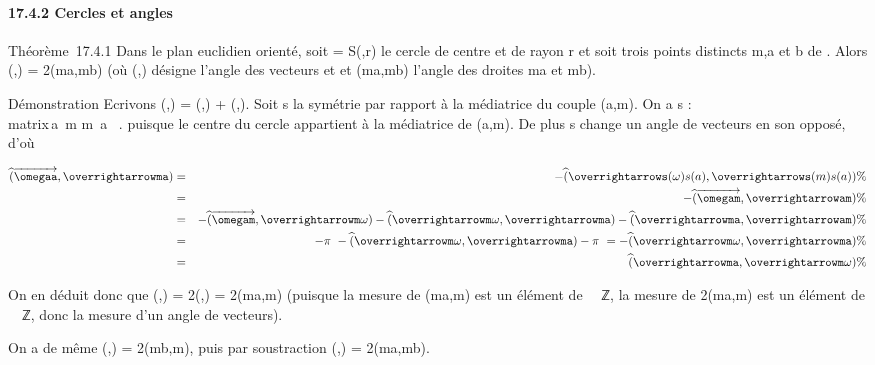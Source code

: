 \documentclass[]{article}
\begin{document}
\paragraph{17.4.2 Cercles et angles}

Théorème~17.4.1 Dans le plan euclidien orienté, soit \Gamma = S(\omega,r) le
cercle de centre \omega et de rayon r et soit trois points distincts m,a et b
de \Gamma. Alors
\widehat(\overrightarrow\omegaa,\overrightarrow\omegab)
= 2\widehat(ma,mb) (où
\widehat(\overrightarrow\omegaa,\overrightarrow\omegab)
désigne l'angle des vecteurs \overrightarrow\omegaa et
\overrightarrow\omegab et
\widehat(ma,mb) l'angle des droites ma et mb).

Démonstration Ecrivons
\widehat(\overrightarrow\omegaa,\overrightarrowm\omega)
=\widehat
(\overrightarrow\omegaa,\overrightarrowma)
+\widehat
(\overrightarrowma,\overrightarrowm\omega).
Soit s la symétrie par rapport à la médiatrice du couple (a,m). On a s :
\left
\\matrix\,a\mapsto~m
\cr m\mapsto~a \cr
\omega\mapsto~\omega\right . puisque le
centre du cercle appartient à la médiatrice de (a,m). De plus s change
un angle de vecteurs en son opposé, d'où

\begin{align*}
\widehat(\overrightarrow\omegaa,\overrightarrowma)&
=&
-\widehat(\overrightarrows(\omega)s(a),\overrightarrows(m)s(a))
\%& \\ & =&
-\widehat(\overrightarrow\omegam,\overrightarrowam)
\%& \\ & =&
-\widehat(\overrightarrow\omegam,\overrightarrowm\omega)
-\widehat
(\overrightarrowm\omega,\overrightarrowma)
-\widehat
(\overrightarrowma,\overrightarrowam)\%&
\\ & =& -\pi~ -\widehat
(\overrightarrowm\omega,\overrightarrowma)
- \pi~ =
-\widehat(\overrightarrowm\omega,\overrightarrowma)
\%& \\ & =&
\widehat(\overrightarrowma,\overrightarrowm\omega)
\%& \\ \end{align*}

On en déduit donc que
\widehat(\overrightarrow\omegaa,\overrightarrowm\omega)
=
2\widehat(\overrightarrowma,\overrightarrowm\omega)
= 2\widehat(ma,m\omega) (puisque la mesure de
\widehat(ma,m\omega) est un élément de ~\diagup\pi~ℤ, la mesure de
2\widehat(ma,m\omega) est un élément de ~\pi~ℤ, donc la
mesure d'un angle de vecteurs).

On a de même
\widehat(\overrightarrow\omegab,\overrightarrowm\omega)
= 2\widehat(mb,m\omega), puis par soustraction
\widehat(\overrightarrow\omegaa,\overrightarrow\omegab)
= 2\widehat(ma,mb).
\end{document}
